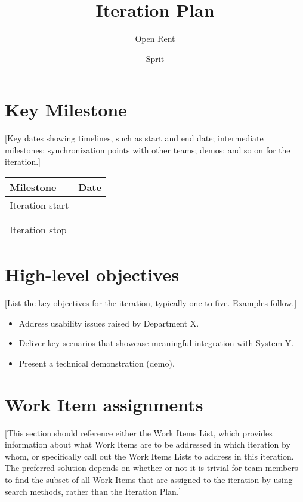 \documentclass[a4paper,notitlepage]{article}%
\begin{document}
\title{Iteration Plan}
\author{Open Rent}
\date{Sprit }
\maketitle

\section{Key Milestone}

[Key dates showing timelines, such as start and end date; intermediate milestones; synchronization points with other teams; demos; and so on for the iteration.]

\noindent\begin{tabular}{|l|l|}
\hline
Milestone       & Date \\ \hline
Iteration start &      \\ \hline
                &      \\ \hline
                &      \\ \hline
Iteration stop  &      \\ \hline
\end{tabular}

\section{High-level objectives}

[List the key objectives for the iteration, typically one to five. Examples follow.]
\begin{itemize}
	\item Address usability issues raised by Department X.
	\item	Deliver key scenarios that showcase meaningful integration with System Y.
	\item	Present a technical demonstration (demo).
\end{itemize}

\section{Work Item assignments}

[This section should reference either the Work Items List, which provides information about what Work Items are to be addressed in which iteration by whom, or specifically call out the Work Items Lists to address in this iteration. The preferred solution depends on whether or not it is trivial for team members to find the subset of all Work Items that are assigned to the iteration by using search methods, rather than the Iteration Plan.]
\end{document}
